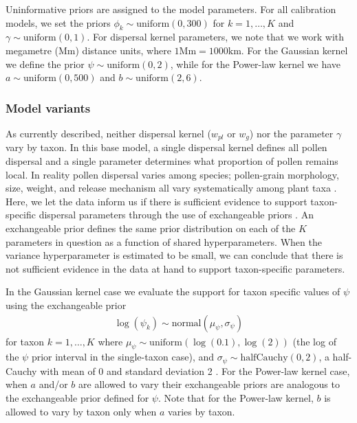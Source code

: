 \documentclass[12pt]{article}
\begin{document}
Uninformative priors are assigned to the model parameters. For all
calibration models, we set the priors $\phi_k \sim \text{uniform}(0,
300)$ for $k=1, \ldots, K$ and $\gamma \sim \text{uniform}(0,1)$. For
dispersal kernel parameters, we note that we work with megametre (Mm)
distance units, where $1 \text{Mm} = 1000 \text{km}$. For the Gaussian
kernel we define the prior $\psi \sim \text{uniform}(0, 2)$, while for
the Power-law kernel we have $a \sim \text{uniform}(0, 500)$ and $b
\sim \text{uniform}(2, 6)$.

\subsubsection{Model variants}
\label{variants}

As currently described, neither dispersal kernel ($w_{pl}$ or $w_g$)
nor the parameter $\gamma$ vary by taxon. In this base model, a single
dispersal kernel defines all pollen dispersal and a single parameter
determines what proportion of pollen remains local. In reality pollen
dispersal varies among species; pollen-grain morphology, size, weight,
and release mechanism all vary systematically among plant taxa
\citep{jackson1999pollen}. Here, we let the data inform us if there is
sufficient evidence to support taxon-specific dispersal parameters
through the use of exchangeable priors \citep{gelman2014bayesian}. An
exchangeable prior defines the same prior distribution on each of the
$K$ parameters in question as a function of shared
hyperparameters. When the variance hyperparameter is estimated to be
small, we can conclude that there is not sufficient evidence in the
data at hand to support taxon-specific parameters.

In the Gaussian kernel case we evaluate the support for taxon specific
values of $\psi$ using the exchangeable prior
\begin{align}
\log(\psi_k) \sim \text{normal}( \mu_{\psi}, \sigma_{\psi})
\end{align}
for taxon $k=1, \ldots, K$ where $\mu_{\psi} \sim
\text{uniform}(\log(0.1),\log(2))$ (the log of the $\psi$ prior
interval in the single-taxon case), and $\sigma_{\psi} \sim
\text{halfCauchy}(0, 2)$, a half-Cauchy with mean of 0 and standard
deviation 2 \citep{gelman2006prior}. For the Power-law kernel case,
when $a$ and/or $b$ are allowed to vary their exchangeable priors are
analogous to the exchangeable prior defined for $\psi$. Note that for
the Power-law kernel, $b$ is allowed to vary by taxon only when $a$
varies by taxon.
\end{document}
